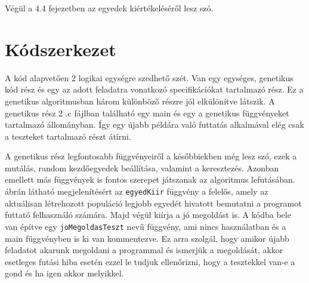 \documentclass[12pt,a4paper,oneside]{report}
\begin{document}
	{Végül a 4.4 fejezetben az egyedek kiértékeléséről lesz szó.}


    \section{Kódszerkezet} %
		A kód alapvetően 2 logikai egységre szedhető szét.
		Van egy egységes, genetikus kód rész és egy az adott feladatra vonatkozó specifikációkat tartalmazó rész.
		Ez a genetikus algoritmusban három különböző részre jól elkülönítve látszik.
		A genetikus rész 2 .c fájlban található egy main és egy a genetikus függvényeket tartalmazó állományban.
		Így egy újabb példára való futtatás alkalmával elég csak a teszteket tartalmazó részt átírni.
		
		
		A genetikus rész legfontosabb függvényeiről a későbbiekben még lesz szó, ezek a mutálás, random kezdőegyedek beállítása, valamint a keresztezés.
		Azonban emellett más függvények is fontos szerepet játszanak az algoritmus lefutásában.
		 ábrán látható megjelenítésért az \texttt{egyedKiir} függvény a felelős, amely az aktuálisan létrehozott populáció legjobb egyedét hivatott bemutatni a programot futtató felhasználó számára.
		Majd végül kiírja a jó megoldást is.
		A kódba bele van építve egy \texttt{joMegoldasTeszt} nevű függvény, ami nincs használatban és a main függvényben is ki van kommentezve.
		Ez arra szolgál, hogy amikor újabb feladatot akarunk megoldani a programmal és ismerjük a megoldását, akkor esetleges futási hiba esetén ezzel le tudjuk ellenőrizni, hogy a tesztekkel van-e a gond és ha igen akkor melyikkel.
		
		
\end{document}
